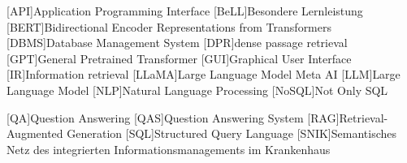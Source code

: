 \begin{acronym}[SPARQL]
[API]{Application Programming Interface}
[BeLL]{Besondere Lernleistung}
[BERT]{Bidirectional Encoder Representations from Transformers}
[DBMS]{Database Management System}
[DPR]{dense passage retrieval}
[GPT]{General Pretrained Transformer}
[GUI]{Graphical User Interface}
[IR]{Information retrieval}
[LLaMA]{Large Language Model Meta AI}
[LLM]{Large Language Model}
[NLP]{Natural Language Processing}
[NoSQL]{Not Only SQL}

[QA]{Question Answering}
[QAS]{Question Answering System}
[RAG]{Retrieval-Augmented Generation}
[SQL]{Structured Query Language}
[SNIK]{Semantisches Netz des integrierten Informationsmanagements im Krankenhaus}
\end{acronym}
